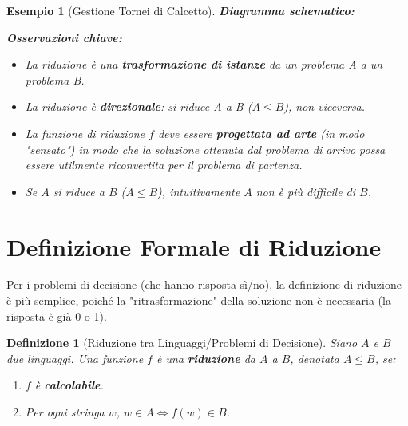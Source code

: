 \documentclass[a4paper]{article}
\newtheorem{definition}[theorem]{Definizione}
\newtheorem{example}[theorem]{Esempio}
\begin{document}
\begin{example}[Gestione Tornei di Calcetto]
\textbf{Diagramma schematico:}
\begin{center}
\end{center}

\textbf{Osservazioni chiave:}
\begin{itemize}
    \item La riduzione è una \textbf{trasformazione di istanze} da un problema A a un problema B.
    \item La riduzione è \textbf{direzionale}: si riduce A a B ($A \le B$), non viceversa.
    \item La funzione di riduzione $f$ deve essere \textbf{progettata ad arte} (in modo "sensato") in modo che la soluzione ottenuta dal problema di arrivo possa essere utilmente riconvertita per il problema di partenza.
    \item Se $A$ si riduce a $B$ ($A \le B$), intuitivamente $A$ non è più difficile di $B$.
\end{itemize}
\end{example}

\section{Definizione Formale di Riduzione}

Per i problemi di decisione (che hanno risposta sì/no), la definizione di riduzione è più semplice, poiché la "ritrasformazione" della soluzione non è necessaria (la risposta è già 0 o 1).

\begin{definition}[Riduzione tra Linguaggi/Problemi di Decisione]
Siano $A$ e $B$ due linguaggi. Una funzione $f$ è una \textbf{riduzione} da $A$ a $B$, denotata $A \le B$, se:
\begin{enumerate}
    \item $f$ è \textbf{calcolabile}.
    \item Per ogni stringa $w$, $w \in A \iff f(w) \in B$.
\end{enumerate}
\end{definition}
\end{document}
